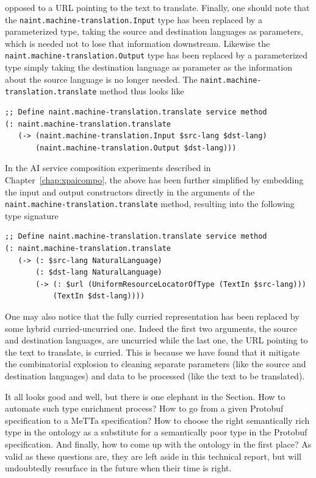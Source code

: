 \documentclass[]{report}
\begin{document}
opposed to a URL pointing to the text to translate.  Finally, one
should note that the
\texttt{naint.machine-translation.Input} type has been
replaced by a parameterized type, taking the source and destination
languages as parameters, which is needed not to lose that information
downstream.  Likewise the
\texttt{naint.machine-translation.Output} type has been
replaced by a parameterized type simply taking the destination
language as parameter as the information about the source language is
no longer needed.  The
\texttt{naint.machine-translation.translate} method thus
looks like
\begin{verbatim}
;; Define naint.machine-translation.translate service method
(: naint.machine-translation.translate
   (-> (naint.machine-translation.Input $src-lang $dst-lang)
       (naint.machine-translation.Output $dst-lang)))
\end{verbatim}
In the AI service composition experiments described in
Chapter~\ref{chap:xpaicompo}, the above has been further simplified by
embedding the input and output constructors directly in the arguments
of the \texttt{naint.machine-translation.translate}
method, resulting into the following type signature
\begin{small}
\begin{verbatim}
;; Define naint.machine-translation.translate service method
(: naint.machine-translation.translate
   (-> (: $src-lang NaturalLanguage)
       (: $dst-lang NaturalLanguage)
       (-> (: $url (UniformResourceLocatorOfType (TextIn $src-lang)))
           (TextIn $dst-lang))))
\end{verbatim}
\end{small}
One may also notice that the fully curried representation has been
replaced by some hybrid curried-uncurried one.  Indeed the first two
arguments, the source and destination languages, are uncurried while
the last one, the URL pointing to the text to translate, is curried.
This is because we have found that it mitigate the combinatorial
explosion to cleaning separate parameters (like the source and
destination languages) and data to be processed (like the text to be
translated).

It all looks good and well, but there is one elephant in the Section.
How to automate such type enrichment process?  How to go from a given
Protobuf specification to a MeTTa specification?  How to choose the
right semantically rich type in the ontology as a substitute for a
semantically poor type in the Protobuf specification.  And finally,
how to come up with the ontology in the first place?  As valid as
these questions are, they are left aside in this technical report, but
will undoubtedly resurface in the future when their time is right.
\end{document}
